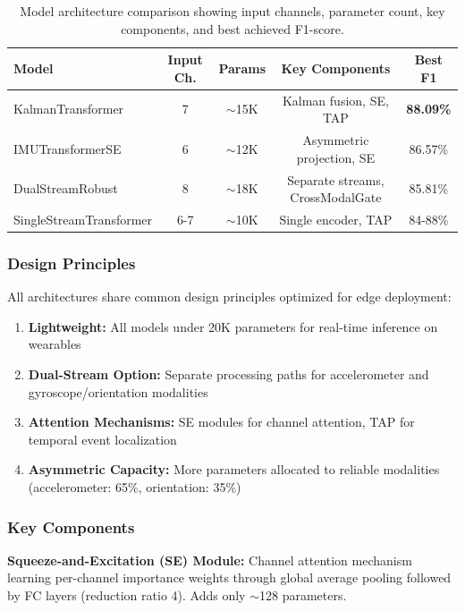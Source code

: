 \documentclass{article}
\begin{document}
\begin{table}[htbp]
    \centering
    \caption{Model architecture comparison showing input channels, parameter count, key components, and best achieved F1-score.}
    \label{tab:arch_comparison}
    \small
    \begin{tabular}{lcccc}
        \toprule
        \textbf{Model} & \textbf{Input Ch.} & \textbf{Params} & \textbf{Key Components} & \textbf{Best F1} \\
        \midrule
        KalmanTransformer & 7 & $\sim$15K & Kalman fusion, SE, TAP & \textbf{88.09\%} \\
        IMUTransformerSE & 6 & $\sim$12K & Asymmetric projection, SE & 86.57\% \\
        DualStreamRobust & 8 & $\sim$18K & Separate streams, CrossModalGate & 85.81\% \\
        SingleStreamTransformer & 6-7 & $\sim$10K & Single encoder, TAP & 84-88\% \\
        \bottomrule
    \end{tabular}
\end{table}

\subsubsection{Design Principles}

All architectures share common design principles optimized for edge deployment:

\begin{enumerate}
    \item \textbf{Lightweight:} All models under 20K parameters for real-time inference on wearables
    \item \textbf{Dual-Stream Option:} Separate processing paths for accelerometer and gyroscope/orientation modalities
    \item \textbf{Attention Mechanisms:} SE modules for channel attention, TAP for temporal event localization
    \item \textbf{Asymmetric Capacity:} More parameters allocated to reliable modalities (accelerometer: 65\%, orientation: 35\%)
\end{enumerate}

\subsubsection{Key Components}

\textbf{Squeeze-and-Excitation (SE) Module:} Channel attention mechanism learning per-channel importance weights through global average pooling followed by FC layers (reduction ratio 4). Adds only $\sim$128 parameters.
\end{document}
